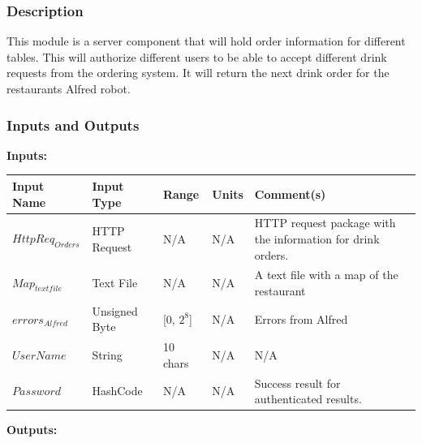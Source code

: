 \documentclass [10pt]{article}
\begin{document}

\subsubsection{Description}
This module is a server component that will hold order information for different tables. This will  authorize different users to be able to accept different drink requests from the ordering system. It will return the next drink order for the restaurants Alfred robot.


\subsubsection{Inputs and Outputs}

\textbf{Inputs: } \\

\begin{longtable}{| p{} | p{} | p{} | p{} | p{} |}\hline 
	\rowcolor{tableCell}\textbf{Input Name} & \textbf{Input Type} & \textbf{Range} & \textbf{Units} & \textbf{Comment(s)} \\ \hline
	$ HttpReq_{Orders} $ & HTTP Request & N/A & N/A & HTTP request package with the information for drink orders. \\ \hline
	\rowcolor{tableCell}$ Map_{textfile} $ & Text File & N/A & N/A & A text file with a map of the restaurant \\ \hline
	$  errors_{Alfred} $ & Unsigned Byte & [0, $2^{8}$]& N/A & Errors from Alfred \\ \hline
	\rowcolor{tableCell}$  UserName $ & String & 10 chars & N/A & N/A\\ \hline
	$  Password $ & HashCode & N/A & N/A &  Success result for authenticated results. \\ \hline
\end{longtable}


\textbf{Outputs: } \\
\end{document}

